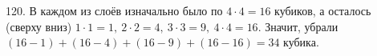 120. В каждом из слоёв изначально было по $4\cdot4=16$ кубиков, а осталось (сверху вниз) $1\cdot1=1,\ 2\cdot2=4,\ 3\cdot3=9,\ 4\cdot4=16.$ Значит, убрали $(16-1)+(16-4)+(16-9)+(16-16)=34$ кубика.\\
